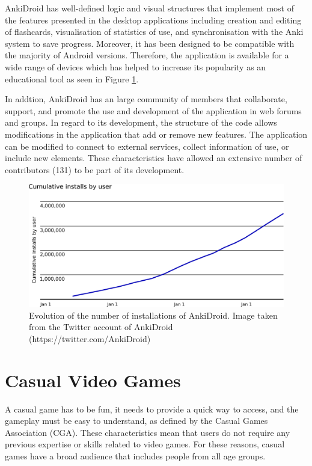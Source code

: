 AnkiDroid has well-defined logic and visual structures \citep{zamora2011ankidroid} that implement most of the features presented in the desktop applications including creation and editing of flashcards, visualisation of statistics of use, and synchronisation with the Anki system to save progress. Moreover, it has been designed to be compatible with the majority of Android versions. Therefore, the application is available for a wide range of devices which has helped to increase its popularity as an educational tool as seen in Figure \ref{fig:anki-evolution}.

In addtion, AnkiDroid has an large community of members that collaborate, support, and promote the use and development of the application in web forums and groups. In regard to its development, the structure of the code allows modifications in the application that add or remove new features. The application can be modified to connect to external services, collect information of use, or include new elements. These characteristics have allowed an extensive number of contributors (131) to be part of its development.

\begin{figure}[htb]
    \vskip 5mm
        \begin{center}
            \includegraphics[scale=0.4]{./Figures/anki_progress.png}
            \caption{Evolution of the number of installations of AnkiDroid. Image taken from the Twitter account of AnkiDroid (https://twitter.com/AnkiDroid)}
            \label{fig:anki-evolution}
        \end{center}
    \vskip -5mm
\end{figure}


\section{Casual Video Games}
A casual game has to be fun, it needs to provide a quick way to access, and the gameplay must be easy to understand, as defined by the Casual Games Association (CGA). These characteristics mean that users do not require any previous expertise or skills related to video games. For these reasons, casual games have a broad audience that includes people from all age groups.

